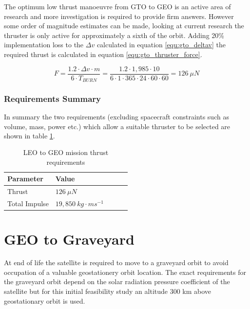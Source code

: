 \documentclass[a4paper, article, oneside, UKenglish]{memoir}
\newcommand{\0}{\mathbf{0}}
\newcommand{\1}{\mathbf{1}}
\begin{document}
The optimum low thrust manoeuvre from GTO to GEO is an active area of research and more investigation is required to provide firm answers.  However some order of magnitude estimates can be made, looking at current research the thruster is only active for approximately a sixth of the orbit\cite{gto_to_geo}.  Adding 20\% implementation loss to the $\Delta v$ calculated in equation \ref{equ:gto_deltav} the required thrust is calculated in equation \ref{equ:gto_thruster_force}.

\begin{equation}
F = \frac{1.2 \cdot \Delta v \cdot m}{6 \cdot T_{BURN}} = \frac{1.2 \cdot 1,985 \cdot 10}{6 \cdot 1 \cdot 365 \cdot 24 \cdot 60 \cdot 60} = 126 ~ \mu N
\label{equ:gto_thruster_force}
\end{equation}

\subsection{Requirements Summary}

In summary the two requirements (excluding spacecraft constraints such as volume, mass, power etc.) which allow a suitable thruster to be selected are shown in table \ref{tab:gto_to_geo_thruster_requirements}.

\begin{table}[h]
\centering
\begin{tabular}{@{}lllll@{}}
\toprule
Parameter					& Value							\\ \midrule
Thrust						& $126 ~ \mu N$					\\
Total Impulse				& $19,850~kg \cdot ms^{-1}$		\\ \bottomrule
\end{tabular}
\captionsetup{justification=centering}
\caption{LEO to GEO mission thrust requirements}
\label{tab:gto_to_geo_thruster_requirements}
\end{table}



\chapter{GEO to Graveyard}

At end of life the satellite is required to move to a graveyard orbit to avoid occupation of a valuable geostationery orbit location.  The exact requirements for the graveyard orbit depend on the solar radiation pressure coefficient of the satellite but for this initial feasibility study an altitude 300 km above geostationary orbit is used.
\end{document}
